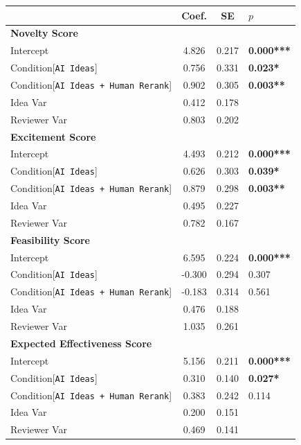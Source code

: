 \begin{table}[ht]
\small 
\centering
\begin{tabular}{l c c l} 
 \hline
 & Coef. & SE & $p$ \\ 
 \hline
\textbf{Novelty Score} \\
Intercept & 4.826 & 0.217 & \textbf{0.000***} \\ 
Condition[\texttt{AI Ideas}] & 0.756 & 0.331 & \textbf{0.023*} \\
Condition[\texttt{AI Ideas + Human Rerank}] & 0.902 & 0.305 & \textbf{0.003**} \\
Idea Var & 0.412 & 0.178 & \\
Reviewer Var & 0.803 & 0.202 & \\
 \hline
\textbf{Excitement Score} \\
Intercept & 4.493 & 0.212 & \textbf{0.000***} \\ 
Condition[\texttt{AI Ideas}] & 0.626 & 0.303 & \textbf{0.039*} \\
Condition[\texttt{AI Ideas + Human Rerank}] & 0.879 & 0.298 & \textbf{0.003**} \\
Idea Var & 0.495 & 0.227 & \\
Reviewer Var & 0.782 & 0.167 & \\
 \hline
\textbf{Feasibility Score} \\
Intercept & 6.595 & 0.224 & \textbf{0.000***} \\ 
Condition[\texttt{AI Ideas}] & -0.300 & 0.294 & 0.307 \\
Condition[\texttt{AI Ideas + Human Rerank}] & -0.183 & 0.314 & 0.561 \\
Idea Var & 0.476 & 0.188 & \\
Reviewer Var & 1.035 & 0.261 & \\
 \hline
\textbf{Expected Effectiveness Score} \\
Intercept & 5.156 & 0.211 & \textbf{0.000***} \\ 
Condition[\texttt{AI Ideas}] & 0.310 & 0.140 & \textbf{0.027*} \\
Condition[\texttt{AI Ideas + Human Rerank}] & 0.383 & 0.242 & 0.114 \\
Idea Var & 0.200 & 0.151 & \\
Reviewer Var & 0.469 & 0.141 & \\

\end{tabular}
\end{table}
